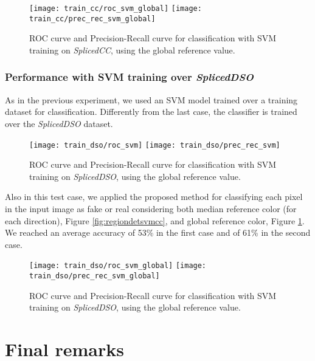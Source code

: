 \begin{figure}[!htb]
  \texttt{[image: train\_cc/roc\_svm\_global]}
\endminipage\hfill
{}
  \texttt{[image: train\_cc/prec\_rec\_svm\_global]}
\endminipage
\caption{ROC curve and Precision-Recall curve for classification with SVM training on \emph{SplicedCC}, using the global reference value.}\label{fig:regiondetsvmglobalcc}
\end{figure}

\subsubsection{Performance with SVM training over \emph{SplicedDSO}}

As in the previous experiment, we used an SVM model trained over a training dataset for classification. Differently from the last case, the classifier is trained over the \emph{SplicedDSO} dataset.

\begin{figure}[!htb]
  \texttt{[image: train\_dso/roc\_svm]}
\endminipage\hfill
{}
  \texttt{[image: train\_dso/prec\_rec\_svm]}
\endminipage
\caption{ROC curve and Precision-Recall curve for classification with SVM training on \emph{SplicedDSO}, using the global reference value.}\label{fig:regiondetsvmdso}
\end{figure}

Also in this test case, we applied the proposed method for classifying each pixel in the input image as fake or real considering both median reference color (for each direction), Figure \ref{fig:regiondetsvmcc}, and global reference color, Figure \ref{fig:regiondetsvmglobalcc}. We reached an average accuracy of 53\% in the first case and of 61\% in the second case.

\begin{figure}[!htb]
  \texttt{[image: train\_dso/roc\_svm\_global]}
\endminipage\hfill
{}
  \texttt{[image: train\_dso/prec\_rec\_svm\_global]}
\endminipage
\caption{ROC curve and Precision-Recall curve for classification with SVM training on \emph{SplicedDSO}, using the global reference value.}\label{fig:regiondetsvmglobaldso}
\end{figure}

\section{Final remarks}

